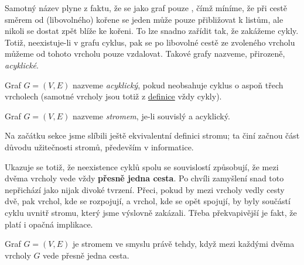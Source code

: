 Samotný název  plyne z faktu, že se jako graf pouze , čímž
míníme, že při cestě směrem od (libovolného) kořene se jeden může pouze
přibližovat k listům, ale nikoli se dostat zpět blíže ke kořeni. To lze snadno
zařídit tak, že zakážeme cykly. Totiž, neexistuje-li v grafu cyklus, pak se po
libovolné cestě ze zvoleného vrcholu můžeme od tohoto vrcholu pouze vzdalovat.
Takové grafy nazveme, přirozeně, \emph{acyklické}.

\begin{definition}
	\label{def:acyklicky-graf}
	Graf $G = (V,E)$ nazveme \emph{acyklický}, pokud neobsahuje cyklus o aspoň
	třech vrcholech (samotné vrcholy jsou totiž z \hyperref[def:cyklus]{definice}
	vždy cykly).
\end{definition}

\begin{definition}[Strom]
	\label{def:strom}
	Graf $G = (V,E)$ nazveme \emph{stromem}, je-li souvislý a acyklický.
\end{definition}

Na začátku sekce jsme slíbili ještě ekvivalentní definici stromu; ta činí začnou
část důvodu užitečnosti stromů, především v informatice.

Ukazuje se totiž, že neexistence cyklů spolu se souvislostí způsobují, že mezi
dvěma vrcholy vede vždy \textbf{přesně jedna cesta}. Po chvíli zamyšlení snad
toto nepřichází jako nijak divoké tvrzení. Přeci, pokud by mezi vrcholy vedly
cesty dvě, pak vrchol, kde se rozpojují, a vrchol, kde se opět spojují, by byly
součástí cyklu uvnitř stromu, který jsme výslovně zakázali. Třeba překvapivější
je fakt, že platí i opačná implikace.

\begin{claim}
	\label{claim:ekvivalentni-definice-stromu}
	Graf $G = (V,E)$ je stromem ve smyslu  právě tehdy,
	když mezi každými dvěma vrcholy $G$ vede přesně jedna cesta.
\end{claim}

